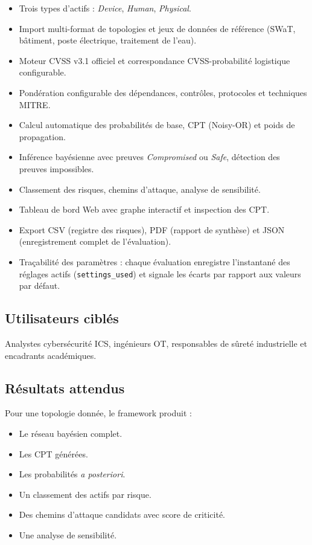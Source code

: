 \documentclass[12pt,a4paper]{article}
\newcommand{\forcereset}[1]{}
\begin{document}
\begin{contributionbox}
\begin{itemize}[leftmargin=1.2cm, itemsep=0.2\baselineskip, topsep=2pt]
    \item Trois types d'actifs : \emph{Device}, \emph{Human}, \emph{Physical}.
    \item Import multi-format de topologies et jeux de données de référence (SWaT, bâtiment, poste électrique, traitement de l'eau).
    \item Moteur CVSS v3.1 officiel et correspondance CVSS-probabilité logistique configurable.
    \item Pondération configurable des dépendances, contrôles, protocoles et techniques MITRE.
    \item Calcul automatique des probabilités de base, CPT (Noisy-OR) et poids de propagation.
    \item Inférence bayésienne avec preuves \emph{Compromised} ou \emph{Safe}, détection des preuves impossibles.
    \item Classement des risques, chemins d'attaque, analyse de sensibilité.
    \item Tableau de bord Web avec graphe interactif et inspection des CPT.
    \item Export CSV (registre des risques), PDF (rapport de synthèse) et JSON (enregistrement complet de l'évaluation).
    \item Traçabilité des paramètres : chaque évaluation enregistre l'instantané des réglages actifs (\texttt{settings\_used}) et signale les écarts par rapport aux valeurs par défaut.
\end{itemize}
\end{contributionbox}

\subsection{Utilisateurs ciblés}
\forcereset{4}

Analystes cybersécurité ICS, ingénieurs OT, responsables de sûreté industrielle et encadrants académiques.

\subsection{Résultats attendus}
\forcereset{5}

Pour une topologie donnée, le framework produit :

\begin{itemize}
    \item Le réseau bayésien complet.
    \item Les CPT générées.
    \item Les probabilités \emph{a posteriori}.
    \item Un classement des actifs par risque.
    \item Des chemins d'attaque candidats avec score de criticité.
    \item Une analyse de sensibilité.
\end{itemize}
\end{document}
